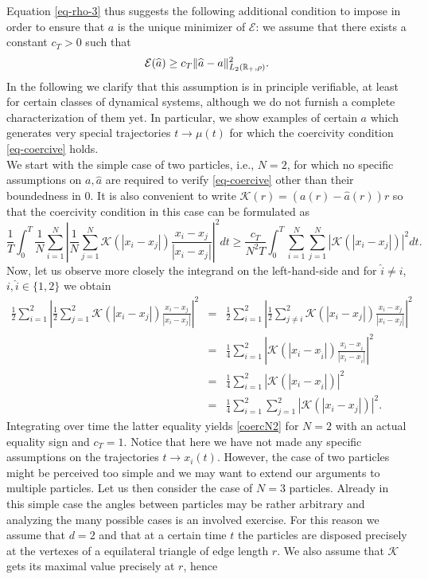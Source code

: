 Equation \eqref{eq-rho-3} thus suggests the following additional condition to impose in order to ensure that $a$ is the unique minimizer of $\mathcal E$: we assume that there exists a constant $c_T>0$ such that
\begin{align}\label{eq-coercive}
	\mathcal E(\widehat a)\geq c_T\|\widehat a-a\|^2_{L_2(\mathbb{R}_+,\rho)}.
\end{align}
In the following we clarify that this assumption is in principle verifiable, at least for certain classes of dynamical systems, although we do not furnish a complete characterization of them yet. In particular, we show examples of certain $a$ which generates very special trajectories $t \to \mu(t)$ for which the  coercivity condition \eqref{eq-coercive} holds.\\
We start with the simple case of two particles, i.e., $N=2$, for which no specific assumptions on $a,\widehat a$ are required to verify \eqref{eq-coercive} other than their boundedness in $0$. It is also convenient to write $\mathcal K(r) = (a(r) - \widehat a(r)) r$ so that the coercivity condition in this case can be formulated as 
\begin{equation}\label{coercN2}
\frac{1}{T} \int_0^T \frac{1}{N} \sum_{i=1}^N \left | \frac{1}{N} \sum_{j=1}^N \mathcal K(|x_i-x_j|) \frac{x_i-x_j}{|x_i-x_j|} \right |^2 dt \geq \frac{c_T}{N^2T} \int_0^T  \sum_{i=1}^N \sum_{j=1}^N |\mathcal K(|x_i-x_j|)|^2  dt.
\end{equation}
Now, let us observe more closely the integrand on the left-hand-side and for $\widehat i \neq i$, $i,  \widehat i \in \{1,2\}$ we obtain
\begin{eqnarray*}
\frac{1}{2} \sum_{i=1}^2 \left | \frac{1}{2} \sum_{j=1}^2 \mathcal K(|x_i-x_j|) \frac{x_i-x_j}{|x_i-x_j|} \right |^2 &=& \frac{1}{2} \sum_{i=1}^2 \left | \frac{1}{2} \sum_{j\neq i}^2 \mathcal K(|x_i-x_j|) \frac{x_i-x_j}{|x_i-x_j|} \right |^2 \\
&=&  \frac{1}{4} \sum_{i=1}^2 \left |  \mathcal K(|x_i-x_{\widehat i}|) \frac{x_i-x_{\widehat i}}{|x_i-x_{\widehat i}|} \right |^2\\
&=& \frac{1}{4} \sum_{i=1}^2 \left |  \mathcal K(|x_i-x_{\widehat i}|) \right |^2\\
&=&\frac{1}{4}  \sum_{i=1}^2 \sum_{j=1}^2 |\mathcal K(|x_i-x_j|)|^2.
\end{eqnarray*}
Integrating over time the latter equality yields \eqref{coercN2} for $N=2$ with an actual equality sign and $c_T=1$. Notice that here we have not made any specific assumptions on the trajectories $t \to x_i(t)$. However, the case of two particles might be perceived too simple and we may want to extend our arguments to multiple particles. Let us then consider the case of $N=3$ particles. Already in this simple case the angles between particles may be rather arbitrary and analyzing the many possible cases is an involved exercise. For this reason we assume that $d=2$  and that at a certain time $t$ the particles are disposed precisely at the vertexes of a equilateral triangle of edge length $r$. We also assume that $\mathcal K$ gets its maximal value precisely at $r$, hence

